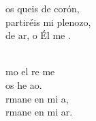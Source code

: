 \begin{cancion}[Amaos][Kairoi]
	os queis de corón,\\
	partiréis mi plenozo,\\
	de ar, o Él me . \\\jump\\
	\begin{chorus}%
	mo el re me  \\
	 os he ao.\\
	rmane en mi a,\\
	rmane en mi ar.\\
	\end{chorus}%
	\jump\\
\end{cancion}%

